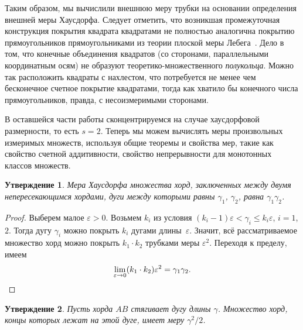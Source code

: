 \documentclass[12pt]{article}
\newtheorem{prep}{Утверждение}
\begin{document}
Таким образом, мы вычислили внешнюю меру трубки на основании определения
внешней меры Хаусдорфа. Следует отметить, что возникшая промежуточная
конструкция покрытия квадрата квадратами не полностью аналогична покрытию
прямоугольников прямоугольниками из теории плоской меры
Лебега~\cite{Kolmogorov:Fomin}. Дело в том, что конечные объединения
квадратов (со сторонами, параллельными координатным осям) не образуют
теоретико-множественного \emph{полукольца}. Можно так расположить квадраты с
нахлестом, что потребуется не менее чем бесконечное счетное покрытие
квадратами, тогда как хватило бы конечного числа прямоугольников, правда, с
несоизмеримыми сторонами.

В оставшейся части работы сконцентрируемся на случае хаусдорфовой размерности,
то есть $s=2$. Теперь мы можем вычислять меры произвольных измеримых множеств,
используя общие теоремы и свойства мер, такие как свойство счетной аддитивности,
свойство непрерывности для монотонных классов множеств.

\begin{prep}
  Мера Хаусдорфа множества хорд, заключенных между двумя непересекающимся
  хордами, дуги между которыми равны $\gamma_1$, $\gamma_2$, равна
  $\gamma_1\gamma_2$.  
\end{prep}
\begin{proof}
  Выберем малое $\varepsilon>0$. Возьмем $k_i$ из условия
  $(k_i-1)\varepsilon<\gamma_i\leqslant k_i \varepsilon$, $i=1$, $2$. Тогда дугу
  $\gamma_i$ можно покрыть $k_i$ дугами длины~$\varepsilon$. Значит, всё
  рассматриваемое множество хорд можно покрыть $k_1\cdot k_2$ трубками меры
  $\varepsilon^2$. Переходя к пределу, имеем
  $$
  \lim_{\varepsilon\to0}
   (k_1\cdot k_2)
  \varepsilon^2=\gamma_1\gamma_2. \qedhere
  $$
\end{proof}

\begin{prep}
  \label{AZ:prep:1}
  Пусть хорда $AB$ стягивает дугу длины $\gamma$. Множество хорд, концы которых
  лежат на этой дуге, имеет меру $\gamma^2/2$.
\end{prep}
\end{document}
